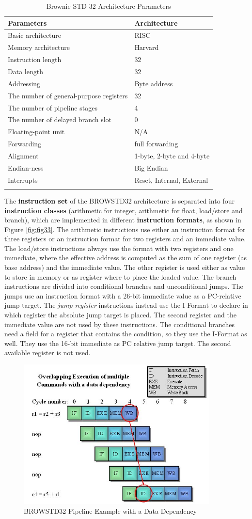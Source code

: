 \begin{longtable}[!htb]{@{}ll@{}}
\toprule
\textbf{Parameters} & \textbf{Architecture}\tabularnewline
\midrule
\endhead
Basic architecture & RISC\tabularnewline
Memory architecture & Harvard\tabularnewline
Instruction length & 32\tabularnewline
Data length & 32\tabularnewline
Addressing & Byte address\tabularnewline
The number of general-purpose registers & 32\tabularnewline
The number of pipeline stages & 4\tabularnewline
The number of delayed branch slot & 0\tabularnewline
Floating-point unit & N/A\tabularnewline
Forwarding & full forwarding\tabularnewline
Alignment & 1-byte, 2-byte and 4-byte\tabularnewline
Endian-ness & Big Endian\tabularnewline
Interrupts & Reset, Internal, External\tabularnewline
\bottomrule
\caption{Brownie STD 32 Architecture Parameters}
\label{fig:fig31}
\end{longtable}
The \textbf{instruction set} of the BROWSTD32 architecture is separated
into four \textbf{instruction classes} (arithmetic for integer,
arithmetic for float, load/store and branch), which are implemented in
different \textbf{instruction formats}, as shown in Figure \ref{fig:fig33}. The arithmetic instructions use
either an instruction format for three registers or an instruction
format for two registers and an immediate value. The load/store
instructions always use the format with two registers and one immediate,
where the effective address is computed as the sum of one register (as
base address) and the immediate value. The other register is used either
as value to store in memory or as register where to place the loaded
value. The branch instructions are divided into conditional branches and
unconditional jumps. The jumps use an instruction format with a 26-bit
immediate value as a PC-relative jump-target. The \emph{jump register}
instructions instead use the I-Format to declare in which register the
absolute jump target is placed. The second register and the immediate
value are not used by these instructions. The conditional branches need
a field for a register that contains the condition, so they use the
I-Format as well. They use the 16-bit immediate as PC relative jump
target. The second available register is not used.
\begin{figure}[!htb]
	\centering
	\includegraphics[width=0.9\textwidth]{src/images/3-2.png}
	\caption{BROWSTD32 Pipeline Example with a Data Dependency}
	\label{fig:fig32}
\end{figure}

